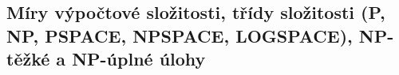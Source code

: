 \subsection{Míry výpočtové složitosti, třídy složitosti (P, NP, PSPACE, NPSPACE, LOGSPACE), NP-těžké a NP-úplné úlohy}